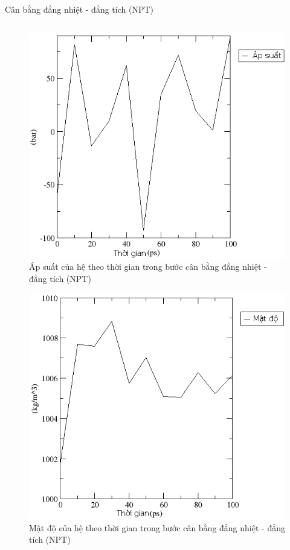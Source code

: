 \documentclass[10pt]{beamer}
\begin{document}
	\begin{frame}{Cân bằng đẳng nhiệt - đẳng tích (NPT)}
	\begin{columns}
	\begin{column}{0.5\textwidth}
		\begin{figure}
		\centering
		\includegraphics[height=0.3\textheight,natwidth=610,natheight=642]{../25pressure2}
		\caption{Áp suất của hệ theo thời gian trong bước cân bằng đẳng nhiệt - đẳng tích (NPT)}
		\label{fig:pressure}
		\end{figure}
		\begin{figure}
		\vspace{-30pt}
		\centering
		\includegraphics[height=0.3\textheight,natwidth=610,natheight=642]{../25density2}
		\caption{Mật độ của hệ theo thời gian trong bước cân bằng đẳng nhiệt - đẳng tích (NPT)}
		\label{fig:density}
		\end{figure}
	\end{column}
	

\end{columns}
\end{frame}
\end{document}
